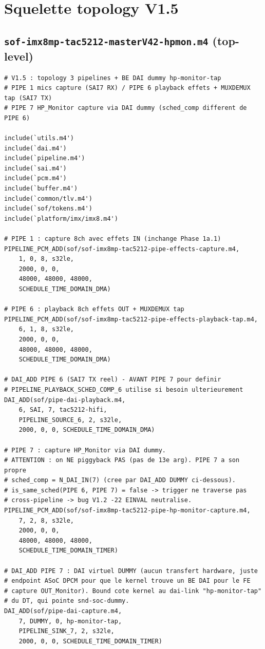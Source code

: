 \documentclass[11pt,a4paper]{article}
\begin{document}
\section{Squelette topology V1.5}

\subsection{\texttt{sof-imx8mp-tac5212-masterV42-hpmon.m4} (top-level)}

\begin{lstlisting}[language={}, basicstyle=\ttfamily\scriptsize]
# V1.5 : topology 3 pipelines + BE DAI dummy hp-monitor-tap
# PIPE 1 mics capture (SAI7 RX) / PIPE 6 playback effets + MUXDEMUX tap (SAI7 TX)
# PIPE 7 HP_Monitor capture via DAI dummy (sched_comp different de PIPE 6)

include(`utils.m4')
include(`dai.m4')
include(`pipeline.m4')
include(`sai.m4')
include(`pcm.m4')
include(`buffer.m4')
include(`common/tlv.m4')
include(`sof/tokens.m4')
include(`platform/imx/imx8.m4')

# PIPE 1 : capture 8ch avec effets IN (inchange Phase 1a.1)
PIPELINE_PCM_ADD(sof/sof-imx8mp-tac5212-pipe-effects-capture.m4,
    1, 0, 8, s32le,
    2000, 0, 0,
    48000, 48000, 48000,
    SCHEDULE_TIME_DOMAIN_DMA)

# PIPE 6 : playback 8ch effets OUT + MUXDEMUX tap
PIPELINE_PCM_ADD(sof/sof-imx8mp-tac5212-pipe-effects-playback-tap.m4,
    6, 1, 8, s32le,
    2000, 0, 0,
    48000, 48000, 48000,
    SCHEDULE_TIME_DOMAIN_DMA)

# DAI_ADD PIPE 6 (SAI7 TX reel) - AVANT PIPE 7 pour definir
# PIPELINE_PLAYBACK_SCHED_COMP_6 utilise si besoin ulterieurement
DAI_ADD(sof/pipe-dai-playback.m4,
    6, SAI, 7, tac5212-hifi,
    PIPELINE_SOURCE_6, 2, s32le,
    2000, 0, 0, SCHEDULE_TIME_DOMAIN_DMA)

# PIPE 7 : capture HP_Monitor via DAI dummy.
# ATTENTION : on NE piggyback PAS (pas de 13e arg). PIPE 7 a son propre
# sched_comp = N_DAI_IN(7) (cree par DAI_ADD DUMMY ci-dessous).
# is_same_sched(PIPE 6, PIPE 7) = false -> trigger ne traverse pas
# cross-pipeline -> bug V1.2 -22 EINVAL neutralise.
PIPELINE_PCM_ADD(sof/sof-imx8mp-tac5212-pipe-hp-monitor-capture.m4,
    7, 2, 8, s32le,
    2000, 0, 0,
    48000, 48000, 48000,
    SCHEDULE_TIME_DOMAIN_TIMER)

# DAI_ADD PIPE 7 : DAI virtuel DUMMY (aucun transfert hardware, juste
# endpoint ASoC DPCM pour que le kernel trouve un BE DAI pour le FE
# capture OUT_Monitor). Bound cote kernel au dai-link "hp-monitor-tap"
# du DT, qui pointe snd-soc-dummy.
DAI_ADD(sof/pipe-dai-capture.m4,
    7, DUMMY, 0, hp-monitor-tap,
    PIPELINE_SINK_7, 2, s32le,
    2000, 0, 0, SCHEDULE_TIME_DOMAIN_TIMER)


\end{lstlisting}
\end{document}
